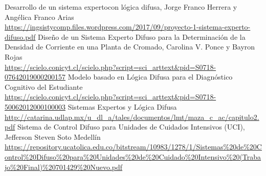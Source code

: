 \documentclass[a4paper, 11pt, titlepage]{article}
\begin{document}
\newpage
\begin{thebibliography}{X}
    \bibitem{} Desarrollo de un sistema expertocon lógica difusa, Jorge Franco Herrera y Angélica Franco Arias \\ \url{https://ingsistycomp.files.wordpress.com/2017/09/proyecto-1-sistema-experto-difuso.pdf}
    \bibitem{} Diseño de un Sistema Experto Difuso para la Determinación de la Densidad de Corriente en una Planta de Cromado, Carolina V. Ponce y Bayron Rojas \\ \url{https://scielo.conicyt.cl/scielo.php?script=sci_arttext&pid=S0718-07642019000200157}
    \bibitem{} Modelo basado en Lógica Difusa para el Diagnóstico Cognitivo del Estudiante \\ \url{https://scielo.conicyt.cl/scielo.php?script=sci_arttext&pid=S0718-50062012000100003}
    \bibitem{} Sistemas Expertos y Lógica Difusa \\ \url{http://catarina.udlap.mx/u_dl_a/tales/documentos/lmt/maza_c_ac/capitulo2.pdf}
    \bibitem{} Sistema de Control Difuso para Unidades de Cuidados Intensivos (UCI), Jefferson Steven Soto Medellín \\ \url{https://repository.ucatolica.edu.co/bitstream/10983/1278/1/Sistemas%20de%20Control%20Difuso%20para%20Unidades%20de%20Cuidado%20Intensivo%20(Trabajo%20Final)%20701429%20Nuevo.pdf}
\end{thebibliography}
\end{document}
